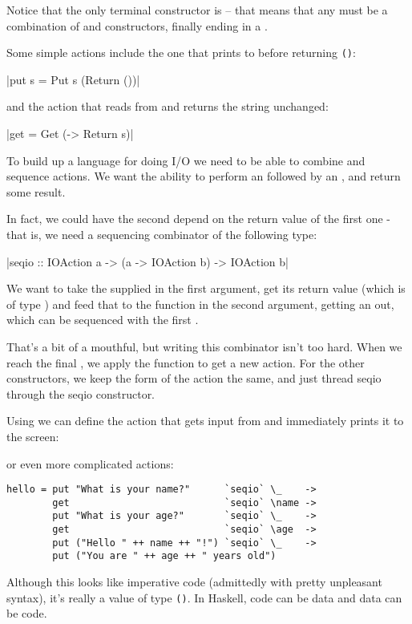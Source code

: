 \documentclass[thesis-solanki.tex]{subfiles}
\begin{document}
Notice that the only terminal constructor is  –
that means that any  must be a combination of  and  constructors, 
finally ending in a .

Some simple actions include the one that prints to  before returning \Verb!()!:

|put s = Put s (Return ())|

and the action that reads from  and returns the string unchanged:

|get = Get (\s -> Return s)|

To build up a language for doing I/O we need to be able to combine and sequence actions. We want the ability to perform an   
followed by an  , and return some result.

In fact, we could have the second  depend on the return value of the first one -
that is, we need a sequencing combinator of the 
following type:

|seqio :: IOAction a -> (a -> IOAction b) -> IOAction b|

We want to take the   supplied in the first argument, get its return value (which is of type ) and feed that to the function in 
the second argument, getting an   out, which can be sequenced with the first  .

That’s a bit of a mouthful, but writing this combinator isn’t too hard. When we reach the final , we apply the function  to get a 
new action. For the other constructors, we keep the form of the action the same, and just thread seqio through the seqio constructor.

Using  we can define the action that gets input from  and immediately prints it to
the screen: 


or even more complicated actions:
\begin{verbatim}
hello = put "What is your name?"      `seqio` \_    ->
        get                           `seqio` \name ->
        put "What is your age?"       `seqio` \_    ->
        get                           `seqio` \age  ->
        put ("Hello " ++ name ++ "!") `seqio` \_    ->
        put ("You are " ++ age ++ " years old")
\end{verbatim}
Although this looks like imperative code (admittedly with pretty unpleasant syntax), it’s really a value of type  \Verb!()!. In Haskell,
code can be data and data can be code.
\end{document}
